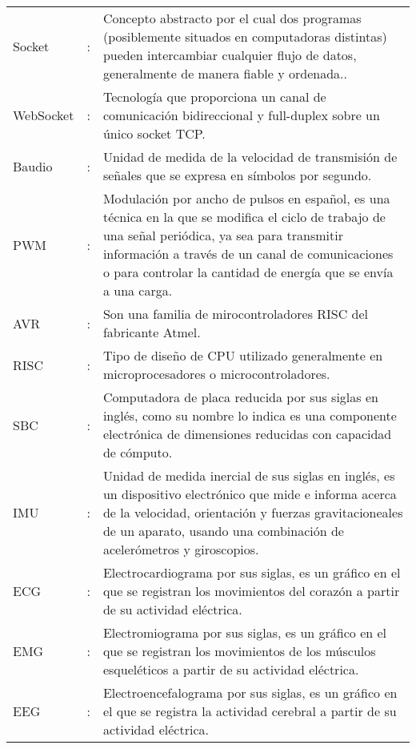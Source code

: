 \newpage
\begin{tabular}{lcp{10.5cm}}
Socket &:& Concepto abstracto por el cual dos programas (posiblemente situados en computadoras distintas) pueden intercambiar cualquier flujo de datos, generalmente de manera fiable y ordenada..\\

WebSocket &:& Tecnología que proporciona un canal de comunicación bidireccional y full-duplex sobre un único socket TCP.\\

Baudio &:& Unidad de medida de la velocidad de transmisión de señales que se expresa en símbolos por segundo.\\

PWM &:& Modulación por ancho de pulsos en español, es una técnica en la que se modifica el ciclo de trabajo de una señal periódica, ya sea para transmitir información a través de un canal de comunicaciones o para controlar la cantidad de energía que se envía a una carga.\\

AVR &:& Son una familia de mirocontroladores RISC del fabricante Atmel.\\

RISC &:& Tipo de diseño de CPU utilizado generalmente en microprocesadores o microcontroladores.\\

SBC &:& Computadora de placa reducida por sus siglas en inglés, como su nombre lo indica es una componente electrónica de dimensiones reducidas con capacidad de cómputo.\\

IMU &:& Unidad de medida inercial de sus siglas en inglés, es un dispositivo electrónico que mide e informa acerca de la velocidad, orientación y fuerzas gravitacioneales de un aparato, usando una combinación de acelerómetros y giroscopios.\\

ECG &:& Electrocardiograma por sus siglas, es un gráfico en el que se registran los movimientos del corazón a partir de su actividad eléctrica.\\

EMG &:& Electromiograma por sus siglas, es un gráfico en el que se registran los movimientos de los músculos esqueléticos a partir de su actividad eléctrica.\\

EEG &:& Electroencefalograma por sus siglas, es un gráfico en el que se registra la actividad cerebral a partir de su actividad eléctrica.\\


\end{tabular}
